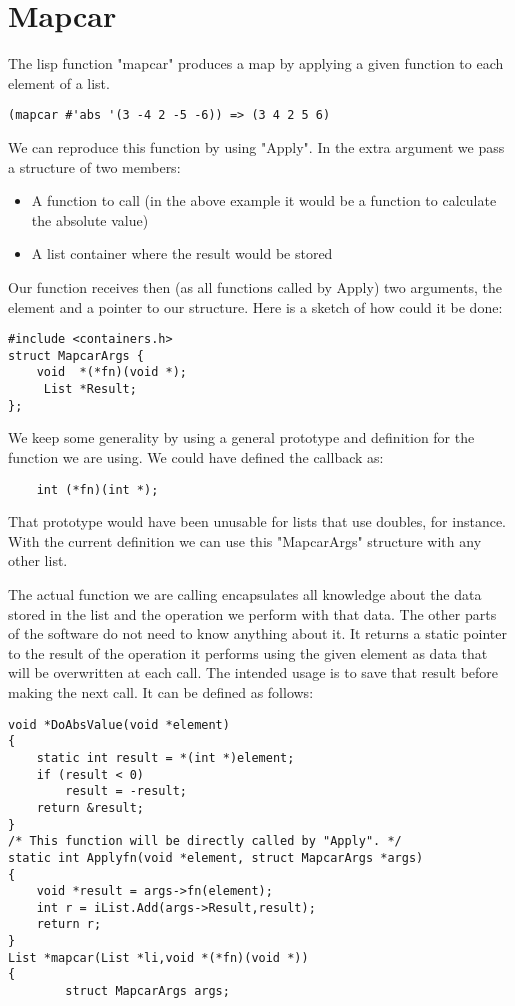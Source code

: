 \documentclass[12pt,a4paper]{memoir} %
\begin{document}
{{\section{Mapcar}
The lisp function "mapcar" produces a map by applying a given function to each element of a list.
\begin{verbatim}
(mapcar #'abs '(3 -4 2 -5 -6)) => (3 4 2 5 6) 
\end{verbatim}
We can reproduce this function by using "Apply". In the extra argument we pass a structure of two members: 
\begin{itemize}
\item A function to call (in the above example it would be a function to calculate the absolute value)
\item A list container where the result would be stored
\end{itemize}
Our function receives then (as all functions called by Apply) two arguments, the element and a pointer to our structure. Here is a sketch of how could it be done:
\begin{verbatim}
#include <containers.h>
struct MapcarArgs {
    void  *(*fn)(void *);
     List *Result;
};
\end{verbatim}
We keep some generality by using a general prototype and definition for the function we are using. We could have defined the callback as:
\begin{verbatim}
    int (*fn)(int *);
\end{verbatim}
That prototype would have been unusable for lists that use doubles, for instance. With the current definition we can use this "MapcarArgs" structure with any other list.

The actual function we are calling encapsulates all knowledge about the data stored in the list and the operation we perform with that data. The other parts of the software do not need to know anything about it.  It returns a static pointer to the result of the operation it performs using the given element as data that will be overwritten at each call. The intended usage is to save that result before making the next call.
It can be defined as follows:
\begin{verbatim}
void *DoAbsValue(void *element)
{
    static int result = *(int *)element;
    if (result < 0)
        result = -result;
    return &result;
}
/* This function will be directly called by "Apply". */
static int Applyfn(void *element, struct MapcarArgs *args)
{
    void *result = args->fn(element);
    int r = iList.Add(args->Result,result);
    return r;
}
List *mapcar(List *li,void *(*fn)(void *))
{
        struct MapcarArgs args;


\end{verbatim}}}
\end{document}
